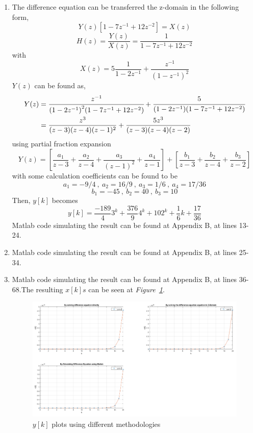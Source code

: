 \documentclass[a4paper,12pt]{article}
\begin{document}
\begin{enumerate}
\begin{enumerate}
			\item The difference equation can be transferred the z-domain in the following form,
				$$	Y(z) \left[ 1-7z^{-1}+12z^{-2} \right]=X(z)	$$
				$$	H(z)=\frac{Y(z)}{X(z)}=\frac{1}{1-7z^{-1}+12z^{-2}} $$
				with $$ X(z)=5\frac{1}{1-2z^{-1}} + \frac{z^{-1}}{{(1-z^{-1})}^{2}}$$ 
				$Y(z)$ can be found as, \\[1cm]				
				\begin{equation}
					\begin{split} 
				Y(z) & =\cfrac{z^{-1}}{{(1-2z^{-1})}^2(1-7z^{-1}+12z^{-2})}+\cfrac{5}{(1-2z^{-1})(1-7z^{-1}+12z^{-2})} \\
				 & =\frac{z^3}{(z-3)(z-4)(z-1)^2}+\frac{5z^3}{(z-3)(z-4)(z-2)} \end{split} 				\end{equation}				
				using partial fraction expansion 
				$$ Y(z)= \left[ \frac{a_1}{z-3}+\frac{a_2}{z-4}+\frac{a_3}{{(z-1)}^2}+\frac{a_4}{z-1} \right] + \left[ \frac{b_1}{z-3} +\frac{b_2}{z-4} + \frac{b_3}{z-2} \right]  $$
				with some calculation coefficients can be found to be 
				$$ \ \boxed{a_1=-9/4}	\ , \ \boxed{a_2=16/9}	\ , \ \boxed{a_3=1/6}	\ , \ \boxed{a_4=17/36}	\ $$ $$ \ \boxed{b_1=-45} \ , \ \boxed{b_2=40}	\ , \ \boxed{b_3=10}	\ $$	
				Then, $y[k]$ becomes
				$$\boxed{	y[k]=\frac{-189}{4}3^k+\frac{376}{9}4^k+102^k+\frac{1}{6}k+\frac{17}{36}	}$$
			Matlab code simulating the result can be found at Appendix B, at lines 13-24.
			\item Matlab code simulating the result can be found at Appendix B, at lines 25-34.
			\item Matlab code simulating the result can be found at Appendix B, at lines 36-68.The resulting $x[k]s$ can be seen at \textit{Figure~\ref{fig:method2}}.
			
				\begin{figure}[H]
					\center
					\setlength{\unitlength}{\textwidth} 
					\includegraphics[width=1.0\unitlength]{3d2}
					\caption{\label{fig:method2}$y[k]$ plots using different methodologies }
				\end{figure}
		

\end{enumerate}
\end{enumerate}
\end{document}
